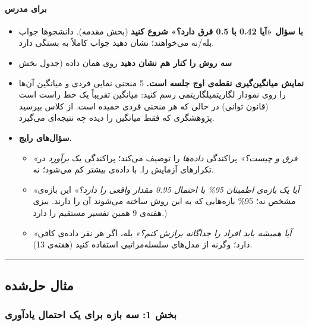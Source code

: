 \paragraph{برای مدرس}

\begin{itemize}
\tightlist
\item
  \textbf{با سؤال «آیا 0.42 با 0.5 فرق دارد؟» شروع کنید} (بخش مقدمه).
  دانشجوها جواب بله/نه می‌خواهند؛ نشان دهید جواب کاملاً به  بستگی
  دارد.
\item
  \textbf{سه روش را کنار هم نشان دهید} روی همان داده (جدول بخش 
\item
  \textbf{نمایش میانگین‌گیری نقطه‌ی اوج جلسه است.} 5 منحنی نمایی فردی و
  میانگین آن‌ها را روی نمودار لگاریتمی\lr{--}لگاریتمی رسم کنید: میانگین تقریباً
  یک خط راست است (قانون توانی) در حالی که هر منحنی فردی خمیده است. از
  کلاس بپرسید پژوهشگری که فقط میانگین را دیده چه نتیجه‌ای می‌گیرد.
\item
  \textbf{سؤال‌های رایج.}

  \begin{itemize}
  \tightlist
  \item
    \emph{«فرق  و  چیست؟»}  پراکندگی \emph{داده‌ها}
    را توصیف می‌کند؛  پراکندگی یک \emph{برآورد} در تکرارهای آزمایش
    را.  با داده‌ی بیشتر کم می‌شود؛  نه.
  \item
    \emph{«آیا یک بازه‌ی اطمینان 95\% با احتمال 0.95 مقدار واقعی را
    دارد؟»} این بازه‌ی مشخص نه؛ 95\% بازه‌هایی که به این روش ساخته می‌شوند
    آن را دارند.  بیزی هفته‌ی 9 همین تفسیر مستقیم
    را دارد.)
  \item
    \emph{«آیا همیشه باید افراد را جداگانه برازش کنم؟»} بله، اگر هر نفر
    داده‌ی کافی دارد؛ وگرنه از مدل‌های سلسله‌مراتبی استفاده کنید (هفته‌ی
    13).
  \end{itemize}
\end{itemize}

\begin{center}\rule{0.5\linewidth}{0.5pt}\end{center}


\subsection{مثال حل‌شده}

\subsubsection{بخش 1: سه بازه برای یک احتمال یادآوری}

